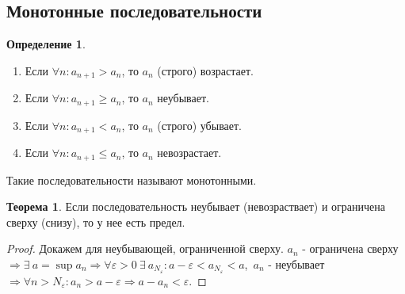 \documentclass[a4paper, 12pt]{article}
\renewcommand{\epsilon}{\varepsilon}
\newcommand\tab[1][.5cm]{\hspace*{#1}}
\theoremstyle{definition}
\newtheorem*{definition}{Определение}
\newtheorem*{theorem}{Теорема}
\begin{document}
        \subsection{Монотонные последовательности}
        \begin{definition} \tab
            \begin{enumerate}
                \item Если $\forall n: a_{n+1}>a_n$, то $a_n$ (строго) возрастает.
                \item Если $\forall n: a_{n+1}\geq a_n$, то $a_n$ неубывает.
                \item Если $\forall n: a_{n+1}<a_n$, то $a_n$ (строго) убывает.
                \item Если $\forall n: a_{n+1}\leq a_n$, то $a_n$ невозрастает.
            \end{enumerate}
            Такие последовательности называют монотонными.
        \end{definition} 
        \begin{theorem}
            Если последовательность неубывает (невозраствает) и ограничена сверху (снизу), то у нее есть предел.
        \end{theorem}
        \begin{proof}
            Докажем для неубывающей, ограниченной сверху. $a_n$ - ограничена сверху $\Rightarrow \exists\ a=\sup a_n \Rightarrow \forall \epsilon>0\ \exists\ a_{N_{\epsilon}}: a-\epsilon<a_{N_{\epsilon}}<a$,\ $a_n$ - неубывает $\Rightarrow \forall n>N_{\epsilon}: a_n>a-\epsilon \Rightarrow a-a_n<\epsilon$.
        \end{proof}  
\end{document}
